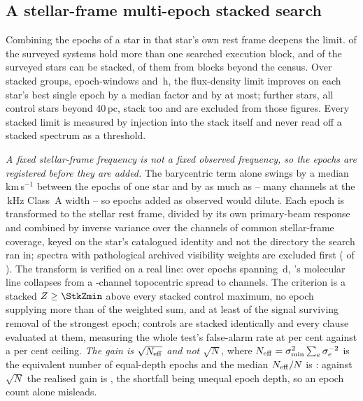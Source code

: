 \subsection{A stellar-frame multi-epoch stacked search}
\label{sec:stack}

Combining the epochs of a star in that star's own rest frame deepens the
limit. \EpMulti{} of the \NSystems{} surveyed systems hold more than one
searched execution block, and \SxStkStarCensus{} of the surveyed stars can be
stacked, \SttNStkOneEb{} of them from blocks beyond the census. Over
\SyStkNGroup{} stacked groups, \SyStkNEpochComb{} epoch-windows and
\SyStkHours\,h, the flux-density limit improves on each star's best single
epoch by a median factor \SyStkGainMed{} and by \SyStkGainMax{} at most;
\SxStkStarOutside{} further stars, all control stars beyond 40\,pc, stack too
and are excluded from those figures. Every
stacked limit is measured by injection into the stack itself and never read
off a stacked spectrum as a threshold.

\emph{A fixed stellar-frame frequency is not a fixed observed frequency, so
the epochs are registered before they are added.} The barycentric term alone
swings by a median \StkVcorrSwingMed\,km\,s$^{-1}$ between the epochs of one
star and by as much as \StkVcorrSwingMax{} -- many channels at the
\StkRefChanKHz\,kHz Class~A width -- so epochs added as observed would
dilute. Each epoch is transformed to the stellar rest frame,
divided by its own primary-beam response and combined by inverse variance
over the channels of common stellar-frame coverage, keyed on the star's
catalogued identity and not the directory the search ran in; spectra with
pathological archived visibility weights are excluded first
(\StkBadWeight{} of \StkNProd). The transform is verified on a real line:
over \StkRegNEpoch{} epochs spanning \StkRegSpanD\,d,
\StkPersistLineStar's molecular line collapses from a
\StkRegTopoChan-channel topocentric spread to \StkRegStellarChan{} channels.
The criterion is a stacked
$Z\ge\StkZmin$ above every stacked control maximum, no epoch supplying more
than \StkDomMax{} of the weighted sum, and at least \StkJkMin{} of the signal
surviving removal of the strongest epoch; controls are stacked identically
and every clause evaluated at them, measuring the whole test's
false-alarm rate at \StkCtrlFap{} per cent against a \StkFapCeil{} per cent
ceiling. \emph{The gain is $\sqrt{N_{\rm eff}}$ and not $\sqrt{N}$}, where
$N_{\rm eff}=\sigma_{\min}^{2}\sum_e\sigma_e^{-2}$ is the equivalent number of
equal-depth epochs and the median $N_{\rm eff}/N$ is \StkNeffFrac: against
$\sqrt{N}$ the realised gain is \StkGainVsN, the shortfall being unequal
epoch depth, so an epoch count alone misleads.

